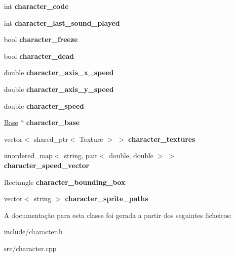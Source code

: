 \begin{DoxyCompactItemize}
int {\bfseries character\+\_\+code}
\item 
\mbox{\label{classCharacter_a8fdf09c04765a29d63a1e92620c312bb}} 
int {\bfseries character\+\_\+last\+\_\+sound\+\_\+played}
\item 
\mbox{\label{classCharacter_ad2a4dbff5a815b1149d827d56c87a3ca}} 
bool {\bfseries character\+\_\+freeze}
\item 
\mbox{\label{classCharacter_a36146a3072561cf6774cf7585c23a686}} 
bool {\bfseries character\+\_\+dead}
\item 
\mbox{\label{classCharacter_a5007dcc89bd0ada538659d13c6db8aae}} 
double {\bfseries character\+\_\+axis\+\_\+x\+\_\+speed}
\item 
\mbox{\label{classCharacter_a2166b91a2e1de6360857187e8573823a}} 
double {\bfseries character\+\_\+axis\+\_\+y\+\_\+speed}
\item 
\mbox{\label{classCharacter_ad18353901814799f84c2f593cb5d672b}} 
double {\bfseries character\+\_\+speed}
\item 
\mbox{\label{classCharacter_a6a4394e283406c8fe024adc9b30e2471}} 
\mbox{\hyperlink{classBase}{Base}} $\ast$ {\bfseries character\+\_\+base}
\item 
\mbox{\label{classCharacter_a142cb14d15395eeb4d70c8a23ad49424}} 
vector$<$ shared\+\_\+ptr$<$ Texture $>$ $>$ {\bfseries character\+\_\+textures}
\item 
\mbox{\label{classCharacter_aaf00f8db42d4342c84bf46ba7fe6aa5e}} 
unordered\+\_\+map$<$ string, pair$<$ double, double $>$ $>$ {\bfseries character\+\_\+speed\+\_\+vector}
\item 
\mbox{\label{classCharacter_ae8861076d477d30e7ecddfb020de4e6c}} 
Rectangle {\bfseries character\+\_\+bounding\+\_\+box}
\item 
\mbox{\label{classCharacter_a0f9aee064038c86932ebb44ef8f98d7d}} 
vector$<$ string $>$ {\bfseries character\+\_\+sprite\+\_\+paths}
\end{DoxyCompactItemize}


A documentação para esta classe foi gerada a partir dos seguintes ficheiros\+:\begin{DoxyCompactItemize}
\item 
include/character.\+h\item 
src/character.\+cpp\end{DoxyCompactItemize}
